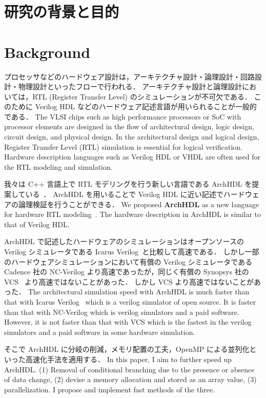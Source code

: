 \section{研究の背景と目的}
\fi
\section{Background}

プロセッサなどのハードウェア設計は，アーキテクチャ設計・論理設計・回路設計・物理設計といったフローで行われる．
アーキテクチャ設計と論理設計においては，RTL (Register Transfer Level) のシミュレーションが不可欠である．
このために Verilog HDL などのハードウェア記述言語が用いられることが一般的である．
\fi
The VLSI chips such as high performance processors or SoC with processor elements are designed in the flow of architectural design,
logic design, circuit design, and physical design.
In the architectural design and logical design, Register Transfer Level (RTL) simulation is essential for logical verification.
Hardware description languages such as Verilog HDL or VHDL are often used for the RTL modeling and simulation.

我々は C++ 言語上で RTL モデリングを行う新しい言語である ArchHDL を提案している~\cite{satos:archhdl}．
ArchHDL を用いることで Verilog HDL に近い記述でハードウェアの論理検証を行うことができる．
\fi
We proposed \textbf{ArchHDL} as a new language for hardware RTL modeling~\cite{satos:archhdl}.
The hardware description in ArchHDL is similar to that of Verilog HDL.

ArchHDL で記述したハードウェアのシミュレーションはオープンソースの Verilog シミュレータである Icarus Verilog~\cite{iverilog}と比較して高速である．
しかし一部のハードウェアシミュレーションにおいて有償の Verilog シミュレータである Cadence 社の NC-Verilog より高速であったが，同じく有償の Synopsys 社の VCS~\cite{vcs} より高速ではないことがあった．
しかし VCS より高速ではないことがあった．
\fi
The architectural simulation speed with ArchHDL is much faster than
that with Icarus Verilog~\cite{iverilog} which is a verilog simulator of open source.
It is faster than that with NC-Verilog which is verilog simulators and a paid software.
However, it is not faster than that with VCS which is the fastest in the verilog simulators and a paid software in some hardware simulation.

そこで ArchHDL に分岐の削減，メモリ配置の工夫，OpenMP による並列化といった高速化手法を適用する．
\fi
In this paper, I aim to further speed up ArchHDL.
(1) Removal of conditional branching due to the presence or absence of data change,
(2) devise a memory allocation and stored as an array value,
(3) parallelization.
I propose and implement fast methods of the three.

